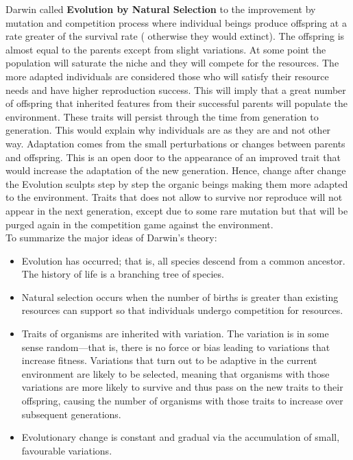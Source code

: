 \documentclass[11pt,oneside,a4paper,openright]{report}
\begin{document}
Darwin called \textbf{Evolution by Natural Selection} to the improvement by mutation and competition process 
where individual beings produce offspring at a rate greater of the survival rate ( otherwise they 
would extinct). The offspring is almost equal to the parents except from slight variations. At 
some point the population will saturate the niche and they will compete for the resources.
The more adapted individuals are considered those who will satisfy their resource needs and
have higher reproduction success. This will imply that a great number of offspring that inherited
features from their successful parents will populate the environment. These traits will persist
through the time from generation to generation. This would explain why individuals are as they are
and not other way. Adaptation comes from the small perturbations or changes between parents and
offspring. This is an open door to the appearance of an improved trait that would increase the adaptation
of the new generation. Hence, change after change the Evolution sculpts step by step the organic beings
making them more adapted to the environment. Traits that does not allow to survive nor reproduce will 
not appear in the next generation, except due to some rare mutation but that will be purged again in the 
competition game against the environment.\\

To summarize the major ideas of Darwin’s theory:
\begin{itemize}
	\item Evolution has occurred; that is, all species descend from a common
	ancestor. The history of life is a branching tree of species.
	\item Natural selection occurs when the number of births is greater than
	existing resources can support so that individuals undergo
	competition for resources.
	\item Traits of organisms are inherited with variation. The variation is in
	some sense random—that is, there is no force or bias leading to
	variations that increase fitness. Variations that turn out to be adaptive in 
	the current environment are likely to be selected, meaning that organisms with 
	those variations are more likely to survive and thus pass on the new traits to their
	offspring, causing the number of organisms with those traits to increase over 
	subsequent generations.
	\item Evolutionary change is constant and gradual via the accumulation of
	small, favourable variations.
\end{itemize}
\end{document}
